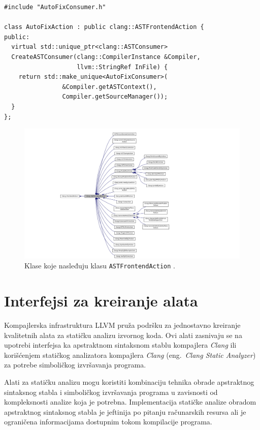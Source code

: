 \documentclass[12pt,oneside]{memoir}
\begin{document}
\begin{lstlisting}[style=customc,  caption={Implementacija klase \texttt{AutoFixAction}. Klasa \texttt{AutoFixConstumer} prikazana je na listingu \ref{lst:labelConsumer} i dostupna je kroz zaglavlje \texttt{AutoFixConsumer.h}.}, label=lst:ASTAction]
#include "AutoFixConsumer.h"

class AutoFixAction : public clang::ASTFrontendAction {
public:
  virtual std::unique_ptr<clang::ASTConsumer>
  CreateASTConsumer(clang::CompilerInstance &Compiler, 
                    llvm::StringRef InFile) {
    return std::make_unique<AutoFixConsumer>(
                &Compiler.getASTContext(),
                Compiler.getSourceManager());
  }
};
\end{lstlisting}


\begin{figure}[h!]
\begin{center}
\includegraphics[scale=0.4]{ASTFrontendAction.png}
\end{center}
\caption{Klase koje nasleđuju klasu \texttt{ASTFrontendAction} \cite{ASTFrontendAction}.}
\label{fig:ASTAction}
\end{figure}



\section{Interfejsi za kreiranje alata}

Kompajlerska infrastruktura LLVM pru\v{z}a podr\v{s}ku za jednostavno kreiranje kvalitetnih alata za stati\v{c}ku analizu izvornog koda. Ovi alati
zasnivaju se na upotrebi interfejsa ka apstraktnom sintaksnom stablu kompajlera \textit{Clang} ili kori\v{s}\'{c}enjem stati\v{c}kog analizatora kompajlera \textit{Clang} (eng.~\textit{Clang Static Analyzer}) za potrebe simboli\v{c}kog izvr\v{s}avanja programa. \par Alati za stati\v{c}ku analizu mogu koristiti kombinaciju tehnika obrade apstraktnog sintaksnog stabla i simboli\v{c}kog izvr\v{s}avanja programa u zavisnosti od kompleksnosti analize koja je potrebna. Implementacija stati\v{c}ke analize obradom apstraktnog sintaksnog stabla je jeftinija po pitanju ra\v{c}unarskih resursa ali je ograni\v{c}ena informacijama dostupnim tokom kompilacije programa. \par 
\end{document}
